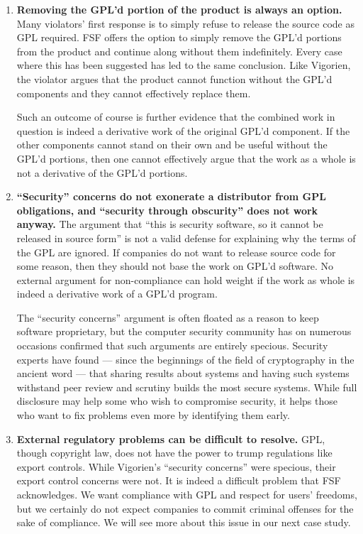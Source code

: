 \documentclass[12pt]{report}
\begin{document}
\begin{enumerate}

\item {\bf Removing the GPL'd portion of the product is always an option.}
  Many violators' first response is to simply refuse to release the source
  code as GPL required.  FSF offers the option to simply remove the GPL'd
  portions from the product and continue along without them indefinitely.
  Every case where this has been suggested has led to the same conclusion.
  Like Vigorien, the violator argues that the product cannot function
  without the GPL'd components and they cannot effectively replace them.

  Such an outcome of course is further evidence that the combined work in
  question is indeed a derivative work of the original GPL'd component.
  If the other components cannot stand on their own and be useful without
  the GPL'd portions, then one cannot effectively argue that the work as a
  whole is not a derivative of the GPL'd portions.


\item {\bf ``Security'' concerns do not exonerate a distributor from GPL
  obligations, and ``security through obscurity'' does not work anyway.}
  The argument that ``this is security software, so it cannot be released
  in source form'' is not a valid defense for explaining why the terms of
  the GPL are ignored.  If companies do not want to release source code
  for some reason, then they should not base the work on GPL'd software.
  No external argument for non-compliance can hold weight if the work as
  whole is indeed a derivative work of a GPL'd program.

  The ``security concerns'' argument is often floated as a reason to keep
  software proprietary, but the computer security community has on
  numerous occasions confirmed that such arguments are entirely specious.
  Security experts have found --- since the beginnings of the field of
  cryptography in the ancient word --- that sharing results about systems
  and having such systems withstand peer review and scrutiny builds the
  most secure systems.  While full disclosure may help some who wish to
  compromise security, it helps those who want to fix problems even more
  by identifying them early.

\item {\bf External regulatory problems can be difficult to resolve.}
  GPL, though copyright law, does not have the power to trump regulations
  like export controls.  While Vigorien's ``security concerns'' were
  specious, their export control concerns were not.  It is indeed a
  difficult problem that FSF acknowledges.  We want compliance with GPL
  and respect for users' freedoms, but we certainly do not expect
  companies to commit criminal offenses for the sake of compliance.  We
  will see more about this issue in our next case study.
\end{enumerate}
\end{document}
